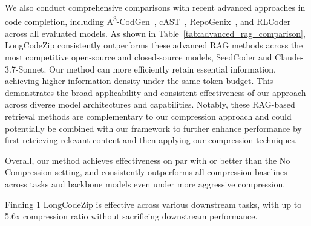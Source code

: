 \documentclass[10pt,conference]{IEEEtran}
\newcommand{\edit}[1]{{\color{black}#1}}
\newcommand{\approach}{{LongCodeZip}\xspace} %
\begin{document}
\edit{We also conduct comprehensive comparisons with recent advanced approaches in code completion, including A\textsuperscript{3}-CodGen~\cite{liao2024a3codgen}, cAST~\cite{zhang2025cast}, RepoGenix~\cite{liang2024repogenix}, and RLCoder~\cite{wang2024rlcoder} across all evaluated models. As shown in Table~\ref{tab:advanced_rag_comparison}, \approach consistently outperforms these advanced RAG methods across the most competitive open-source and closed-source models, SeedCoder and Claude-3.7-Sonnet. Our method can more efficiently retain essential information, achieving higher information density under the same token budget. 
This demonstrates the broad applicability and consistent effectiveness of our approach across diverse model architectures and capabilities. Notably, these RAG-based retrieval methods are complementary to our compression approach and could potentially be combined with our framework to further enhance performance by first retrieving relevant content and then applying our compression techniques.}

Overall, our method achieves effectiveness on par with or better than the No Compression setting, and consistently outperforms all compression baselines across tasks and backbone models even under more aggressive compression.

\begin{finding}{Finding 1}
\approach is effective across various downstream tasks, with up to 5.6x compression ratio without sacrificing downstream performance.
\end{finding}
\end{document}

